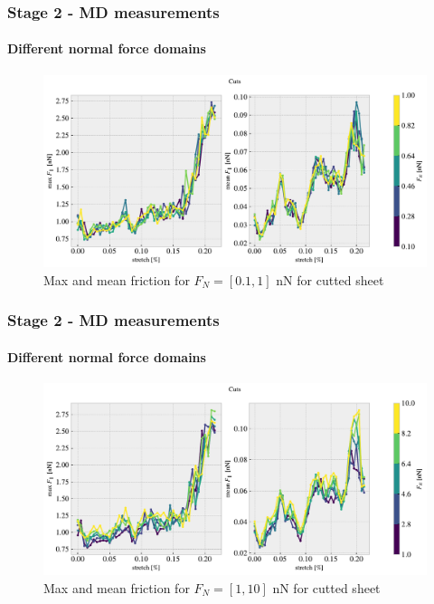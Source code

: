 \documentclass[
	10pt, %
]{beamer}
\begin{document}
\begin{frame}
	\frametitle{Stage 2 - MD measurements}
	\framesubtitle{Different normal force domains}
	\begin{figure}
		\includegraphics[width=\linewidth]{figures/max_mean_lowFN.pdf}
		\caption{Max and mean friction for $F_N = [0.1, 1]$ nN for cutted sheet}
	\end{figure}	
\end{frame}

\begin{frame}
	\frametitle{Stage 2 - MD measurements}
	\framesubtitle{Different normal force domains}
	\begin{figure}
		\includegraphics[width=\linewidth]{figures/max_mean_medFN.pdf}
		\caption{Max and mean friction for $F_N = [1, 10]$ nN for cutted sheet}
	\end{figure}	
\end{frame}
\end{document}
